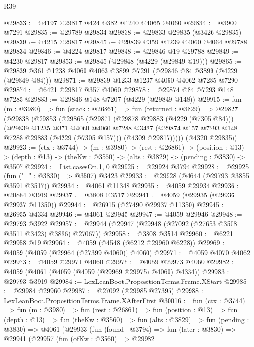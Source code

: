\begin{lexlean}{R39}
\begin{coremodule}
@29833 := @4197 @29817 @424 @382 @1240 @4065 @4060
@29834 := @3900 @7291
@29835 := @29789 @29834
@29838 := @29833 @29835 (@3426 @29835)
@29839 := @4215 @29817
@29845 := @29839 @359 @1239 @4060 @4064 @29788 @29834
@29846 := @4224 @29817
@29848 := @29846 @19 @29788
@29849 := @4230 @29817
@29853 := @29845 (@29848 (@4229 (@29849 @19)))
@29865 := @29839 @361 @1238 @4060 @4063 @3899 @7291 (@29846 @84 @3899 (@4229 (@29849 @84)))
@29871 := @29839 @1233 @1237 @4060 @4062 @7285 @7290
@29874 := @6421 @29817 @357 @4060
@29878 := @29874 @84 @7293 @148 @7285
@29883 := @29846 @148 @7207 (@4229 (@29849 @148))
@29915 := fun (m : @3980) =>
  fun (stack : @26861) =>
  fun (returned : @3829) =>
  @29827
    (@29838
      (@29853
        (@29865
          (@29871
            (@29878 @29883 (@4229 (@7305 @84)))
            (@29839
              @1235
              @371
              @4060
              @4060
              @7288
              @3427
              (@29874 @157 @7293 @148 @7288 @29883 (@4229 (@7305 @157)))
              (@4309 @29817)))))
      (@4320 @29835))
@29923 := (ctx : @3744) ->
  (m : @3980) ->
  (rest : @26861) ->
  (position : @13) ->
  (depth : @13) -> (theKw : @3560) -> (alts : @3829) -> (pending : @3830) -> @3507
@29924 := List.casesOn.{1, 0}
@29925 := @29924 @3794
@29928 := @29925 (fun ("_" : @3830) => @3507) @3423
@29933 := @29928 (@4644 (@29793 @3855 @3591 @3517))
@29934 := @4061 @11348
@29935 := @4059 @29934
@29936 := @20884 @3919
@29937 := @3808 @3517
@29941 := @4059 (@29935 (@29936 @29937 @11350))
@29944 := @26915 (@27490 @29937 @11350)
@29945 := @26955 @4334
@29946 := @4061 @29945
@29947 := @4059 @29946
@29948 := @29793 @3922
@29957 := @29944 (@29947 (@29948 (@27092 (@27653 @3508 @3511 @3423) @3886) @27067))
@29958 := @3808 @3514
@29960 := @6221 @29958 @19
@29964 := @4059 (@4548 (@6212 @29960 @6228))
@29969 := @4059 (@4059 (@29964 (@27399 @4060)) @4060)
@29971 := @4059 @4070 @4062
@29973 := @4059 @29971 @4060
@29975 := @4059 @29973 @4060
@29982 := @4059 (@4061 (@4059 (@4059 (@29969 @29975) @4060) @4334))
@29983 := @29793 @3919
@29984 := LexLeanBoot.PropositionTerms.Frame.XStart
@29985 := @29984 @29960
@29987 := @27092 (@29985 @27395)
@29988 := LexLeanBoot.PropositionTerms.Frame.XAfterFirst
@30016 := fun (ctx : @3744) =>
  fun (m : @3980) =>
  fun (rest : @26861) =>
  fun (position : @13) =>
  fun (depth : @13) =>
  fun (theKw : @3560) =>
  fun (alts : @3829) =>
  fun (pending : @3830) =>
  @4061
    (@29933
      (fun (found : @3794) =>
      fun (later : @3830) =>
      @29941
        (@29957
          (fun (ofKw : @3560) =>
          @29982

\end{coremodule}
\end{lexlean}
